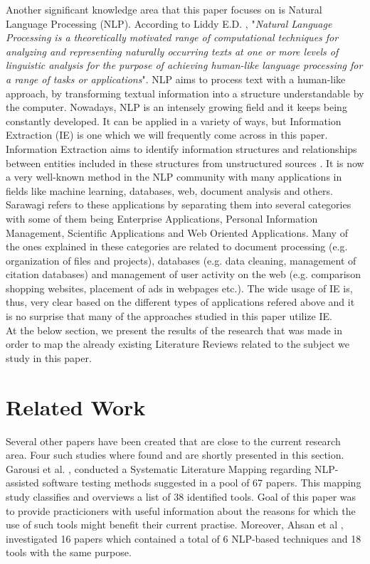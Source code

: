 Another significant knowledge area that this paper focuses on is Natural Language Processing (NLP). According to Liddy E.D. \cite{liddy2001natural}, "\emph{Natural Language Processing is a theoretically motivated 
range of computational techniques for analyzing and representing naturally occurring texts at one or more levels of linguistic analysis for the purpose of achieving human-like language processing for a 
range of tasks or applications}". NLP aims to process text with a human-like approach, by transforming textual information into a structure understandable by the computer. Nowadays, NLP is an intensely growing 
field and it keeps being constantly developed. It can be applied in a variety of ways, but Information Extraction (IE) is one which we will frequently come across in this paper. \\

Information Extraction aims to identify information structures and relationships between entities included in these structures from unstructured sources \cite{infoextraction}. It is now a very well-known 
method in the NLP community with many applications in fields like machine learning, databases, web, document analysis and others. Sarawagi \cite{infoextraction} refers to these applications by separating them 
into several categories with some of them being Enterprise Applications, Personal Information Management, Scientific Applications and Web Oriented Applications. Many of the ones explained in these categories 
are related to document processing (e.g. organization of files and projects), databases (e.g. data cleaning, management of citation databases) and management of user activity on the web (e.g. comparison shopping 
websites, placement of ads in webpages etc.). The wide usage of IE is, thus, very clear based on the different types of applications refered above and it is no surprise that many of the approaches studied in 
this paper utilize IE. \\

At the below section, we present the results of the research that was made in order to map the already existing Literature Reviews related to the subject we study in this paper.

\section{Related Work}

Several other papers have been created that are close to the current research area. Four such studies where found \cite{garousi2020nlp,battina2019artificial,ahsan2017comprehensive,escalona2011overview} 
and are shortly presented in this section. Garousi et al. \cite{garousi2020nlp}, conducted a Systematic Literature Mapping regarding NLP-assisted software testing methods suggested in a pool 
of 67 papers. This mapping study classifies and overviews a list of 38 identified tools. Goal of this paper was to provide practicioners with useful information about the reasons for which 
the use of such tools might benefit their current practise. Moreover, Ahsan et al \cite{ahsan2017comprehensive}, investigated 16 papers which contained a total of 6 NLP-based techniques and 
18 tools with the same purpose. \\

